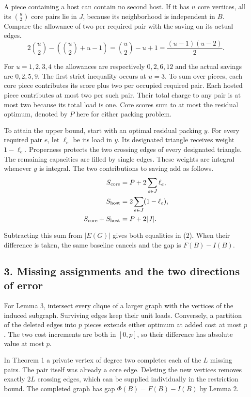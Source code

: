 \documentclass[english,11pt,a4paper]{article}
\begin{document}
A piece containing a host can contain no second host. If it has \(u\) core vertices, all its \(\binom u2\) core pairs lie in \(J\), because its neighborhood is independent in \(B\). Compare the allowance of two per required pair with the saving on its actual edges.
\[
2\binom u2-\left(\binom u2+u-1\right)=\binom u2-u+1=\frac{(u-1)(u-2)}2.
\]

For \(u=1,2,3,4\) the allowances are respectively \(0,2,6,12\) and the actual savings are \(0,2,5,9\). The first strict inequality occurs at \(u=3\). To sum over pieces, each core piece contributes its score plus two per occupied required pair. Each hosted piece contributes at most two per such pair. Their total charge to any pair is at most two because its total load is one. Core scores sum to at most the residual optimum, denoted by \(P\) here for either packing problem.

To attain the upper bound, start with an optimal residual packing \(y\). For every required pair \(e\), let \(\ell_e\) be its load in \(y\). Its designated triangle receives weight \(1-\ell_e\). Properness protects the two crossing edges of every designated triangle. The remaining capacities are filled by single edges. These weights are integral whenever \(y\) is integral. The two contributions to saving add as follows.
\[
\begin{aligned}
S_{\rm core}&=P+2\sum_{e\in J}\ell_e,\\
S_{\rm host}&=2\sum_{e\in J}(1-\ell_e),\\
S_{\rm core}+S_{\rm host}&=P+2|J|.
\end{aligned}
\]

Subtracting this sum from \(|E(G)|\) gives both equalities in (2). When their difference is taken, the same baseline cancels and the gap is \(F(B)-I(B)\).

\subsection{3. Missing assignments and the two directions of error}\label{missing-assignments-and-the-two-directions-of-error}

For Lemma 3, intersect every clique of a larger graph with the vertices of the induced subgraph. Surviving edges keep their unit loads. Conversely, a partition of the deleted edges into \(p\) pieces extends either optimum at added cost at most \(p\). The two cost increments are both in \([0,p]\), so their difference has absolute value at most \(p\).

In Theorem 1 a private vertex of degree two completes each of the \(L\) missing pairs. The pair itself was already a core edge. Deleting the new vertices removes exactly \(2L\) crossing edges, which can be supplied individually in the restriction bound. The completed graph has gap \(\Phi(B)=F(B)-I(B)\) by Lemma 2.
\end{document}
